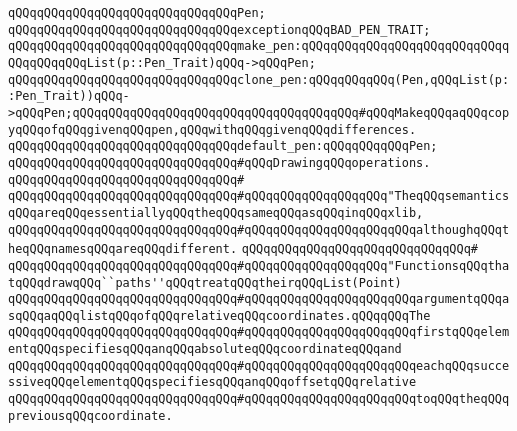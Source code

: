 \newline
\verb|qQQqqQQqqQQqqQQqqQQqqQQqqQQqqQQqPen;|\newline
\newline
\verb|qQQqqQQqqQQqqQQqqQQqqQQqqQQqqQQqexceptionqQQqBAD_PEN_TRAIT;|\newline
\newline
\verb|qQQqqQQqqQQqqQQqqQQqqQQqqQQqqQQqmake_pen:qQQqqQQqqQQqqQQqqQQqqQQqqQQqqQQqqQQqqQQqList(p::Pen_Trait)qQQq->qQQqPen;|\newline
\verb|qQQqqQQqqQQqqQQqqQQqqQQqqQQqqQQqclone_pen:qQQqqQQqqQQq(Pen,qQQqList(p::Pen_Trait))qQQq->qQQqPen;qQQqqQQqqQQqqQQqqQQqqQQqqQQqqQQqqQQqqQQq#qQQqMakeqQQqaqQQqcopyqQQqofqQQqgivenqQQqpen,qQQqwithqQQqgivenqQQqdifferences.|\newline
\verb|qQQqqQQqqQQqqQQqqQQqqQQqqQQqqQQqdefault_pen:qQQqqQQqqQQqPen;|\newline
\newline
\newline
\newline
\newline
\newline
\newline
\verb|qQQqqQQqqQQqqQQqqQQqqQQqqQQqqQQq#qQQqDrawingqQQqoperations.|\newline
\verb|qQQqqQQqqQQqqQQqqQQqqQQqqQQqqQQq#|\newline
\verb|qQQqqQQqqQQqqQQqqQQqqQQqqQQqqQQq#qQQqqQQqqQQqqQQqqQQq"TheqQQqsemanticsqQQqareqQQqessentiallyqQQqtheqQQqsameqQQqasqQQqinqQQqxlib,|\newline
\verb|qQQqqQQqqQQqqQQqqQQqqQQqqQQqqQQq#qQQqqQQqqQQqqQQqqQQqqQQqalthoughqQQqtheqQQqnamesqQQqareqQQqdifferent.|\newline
\verb|qQQqqQQqqQQqqQQqqQQqqQQqqQQqqQQq#|\newline
\verb|qQQqqQQqqQQqqQQqqQQqqQQqqQQqqQQq#qQQqqQQqqQQqqQQqqQQq"FunctionsqQQqthatqQQqdrawqQQq``paths''qQQqtreatqQQqtheirqQQqList(Point)|\newline
\verb|qQQqqQQqqQQqqQQqqQQqqQQqqQQqqQQq#qQQqqQQqqQQqqQQqqQQqqQQqargumentqQQqasqQQqaqQQqlistqQQqofqQQqrelativeqQQqcoordinates.qQQqqQQqThe|\newline
\verb|qQQqqQQqqQQqqQQqqQQqqQQqqQQqqQQq#qQQqqQQqqQQqqQQqqQQqqQQqfirstqQQqelementqQQqspecifiesqQQqanqQQqabsoluteqQQqcoordinateqQQqand|\newline
\verb|qQQqqQQqqQQqqQQqqQQqqQQqqQQqqQQq#qQQqqQQqqQQqqQQqqQQqqQQqeachqQQqsuccessiveqQQqelementqQQqspecifiesqQQqanqQQqoffsetqQQqrelative|\newline
\verb|qQQqqQQqqQQqqQQqqQQqqQQqqQQqqQQq#qQQqqQQqqQQqqQQqqQQqqQQqtoqQQqtheqQQqpreviousqQQqcoordinate.|\newline
